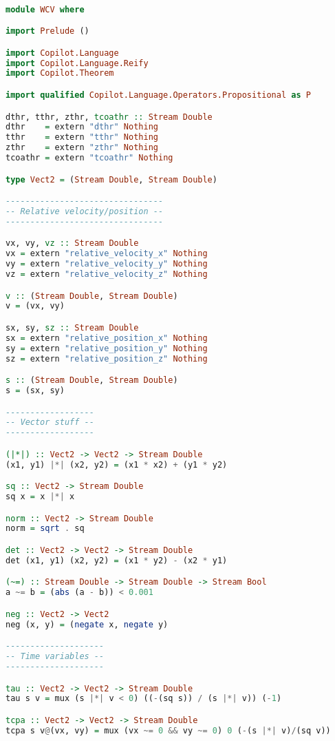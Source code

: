 \begin{lstlisting}[language=Haskell]

module WCV where

import Prelude ()

import Copilot.Language
import Copilot.Language.Reify
import Copilot.Theorem

import qualified Copilot.Language.Operators.Propositional as P

dthr, tthr, zthr, tcoathr :: Stream Double
dthr    = extern "dthr" Nothing
tthr    = extern "tthr" Nothing
zthr    = extern "zthr" Nothing
tcoathr = extern "tcoathr" Nothing

type Vect2 = (Stream Double, Stream Double)

--------------------------------
-- Relative velocity/position --
--------------------------------

vx, vy, vz :: Stream Double
vx = extern "relative_velocity_x" Nothing
vy = extern "relative_velocity_y" Nothing
vz = extern "relative_velocity_z" Nothing

v :: (Stream Double, Stream Double)
v = (vx, vy)

sx, sy, sz :: Stream Double
sx = extern "relative_position_x" Nothing
sy = extern "relative_position_y" Nothing
sz = extern "relative_position_z" Nothing

s :: (Stream Double, Stream Double)
s = (sx, sy)

------------------
-- Vector stuff --
------------------

(|*|) :: Vect2 -> Vect2 -> Stream Double
(x1, y1) |*| (x2, y2) = (x1 * x2) + (y1 * y2)

sq :: Vect2 -> Stream Double
sq x = x |*| x

norm :: Vect2 -> Stream Double
norm = sqrt . sq

det :: Vect2 -> Vect2 -> Stream Double
det (x1, y1) (x2, y2) = (x1 * y2) - (x2 * y1)

(~=) :: Stream Double -> Stream Double -> Stream Bool
a ~= b = (abs (a - b)) < 0.001

neg :: Vect2 -> Vect2
neg (x, y) = (negate x, negate y)

--------------------
-- Time variables --
--------------------

tau :: Vect2 -> Vect2 -> Stream Double
tau s v = mux (s |*| v < 0) ((-(sq s)) / (s |*| v)) (-1)

tcpa :: Vect2 -> Vect2 -> Stream Double
tcpa s v@(vx, vy) = mux (vx ~= 0 && vy ~= 0) 0 (-(s |*| v)/(sq v))


\end{lstlisting}
